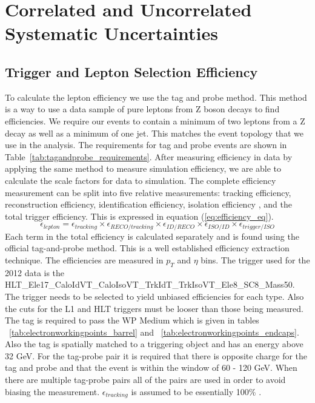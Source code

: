 

\chapter{Correlated and Uncorrelated Systematic Uncertainties}


\section{Trigger and Lepton Selection Efficiency}

To calculate the lepton efficiency we use the tag and probe method. This method is a way to use a data sample of pure leptons from Z boson decays to find efficiencies.  We require our events to contain a minimum of two leptons from a Z decay as well as a minimum of one jet.  This matches the event topology that we use in the analysis. The requirements for tag and probe events are shown in Table~\ref{tab:tagandprobe_requirements}. After measuring efficiency in data by applying the same method to measure simulation efficiency, we are able to calculate the scale factors for data to simulation. The complete efficiency measurement can be split into five relative measurements: tracking efficiency, reconstruction efficiency, identification efficiency, isolation efficiency , and the total trigger efficiency.  This is expressed in equation (\ref{eq:efficiency_eq}).
\begin{equation}
\epsilon_{lepton} = \epsilon_{tracking} \times \epsilon_{RECO/tracking} \times \epsilon_{ID/RECO} \times \epsilon_{ISO/ID} \times \epsilon_{trigger/ISO}
\label{eq:efficiency_eq}
\end{equation}
Each term in the total efficiency is calculated separately and is found using the official tag-and-probe method. This is a well established efficiency extraction technique. The efficiencies are measured in $p_T$ and $\eta$ bins. The trigger used for the 2012 data is the HLT\_Ele17\_CaloIdVT\_CaloIsoVT\_TrkIdT\_TrkIsoVT\_Ele8\_SC8\_Mass50. The trigger needs to be selected to yield unbiased efficiencies for each type. Also the cuts for the L1 and HLT triggers must be looser than those being measured. The tag is required to pass the WP Medium which is given in tables ~\ref{tab:electronworkingpoints_barrel} and ~\ref{tab:electronworkingpoints_endcaps}. Also the tag is spatially matched to a triggering object and has an energy above 32 GeV. For the tag-probe pair it is required that there is opposite charge for the tag and probe and that the event is within the window of 60 - 120 GeV. When there are multiple tag-probe pairs all of the pairs are used in order to avoid biasing the measurement. $\epsilon_{tracking}$ is assumed to be essentially 100\% \cite{WandZCrossSections}.

